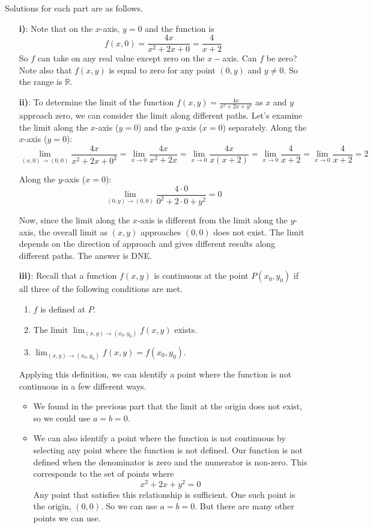     {\color{DarkBlue} 
    Solutions for each part are as follows. 
    \begin{itemize}
        \item[\textbf{i)}:] Note that on the $x$-axis, $y=0$ and the function is
        $$f(x,0) = \frac{4x}{x^2+2x+0} = \frac{4}{x+2}$$
        So $f$ can take on any real value except zero on the $x-$axis. Can $f$ be zero? Note also that $f(x,y)$ is equal to zero for any point $(0,y)$ and $y \ne 0$.  So the range is $\mathbb R$.

        \item[\textbf{ii)}:]  To determine the limit of the function \(f(x, y) = \frac{4x}{x^2 + 2x + y^2}\) as \(x\) and \(y\) approach zero, we can consider the limit along different paths. Let's examine the limit along the \(x\)-axis (\(y = 0\)) and the \(y\)-axis (\(x = 0\)) separately.
        Along the \(x\)-axis (\(y = 0\)):
           \[ \lim_{(x,0)\to(0,0)} \frac{4x}{x^2 + 2x + 0^2} = \lim_{x\to0} \frac{4x}{x^2 + 2x} = \lim_{x\to0} \frac{4x}{x(x + 2)} = \lim_{x\to0} \frac{4}{x + 2} = \lim_{x\to0} \frac{4}{x + 2} = 2 \]
        
            Along the \(y\)-axis (\(x = 0\)):
           \[ \lim_{(0,y)\to(0,0)} \frac{4 \cdot 0}{0^2 + 2 \cdot 0 + y^2} = 0 \]
        
        Now, since the limit along the \(x\)-axis is different from the limit along the \(y\)-axis, the overall limit as \((x, y)\) approaches \((0, 0)\) does not exist. The limit depends on the direction of approach and gives different results along different paths. The answer is DNE. 

        \item[\textbf{iii)}:] Recall that a function $f(x, y)$ is continuous at the point $P(x_0 , y_0 )$ if all three of the following conditions are met. 
        \begin{enumerate}
            \item $f$ is defined at $P$. 
            \item The limit $\displaystyle \lim_{(x,y) \to (x_0,y_0)}f(x,y)$ exists. 
            \item $\displaystyle \lim_{(x,y) \to (x_0,y_0)}f(x,y) = f(x_0,y_0)$.  
        \end{enumerate}
    
        Applying this definition, we can identify a point where the function is not continuous in a few different ways. 
        \begin{itemize}
            \item We found in the previous part that the limit at the origin does not exist, so we could use $a = b = 0$. 
            \item We can also identify a point where the function is not continuous by selecting any point where the function is not defined. Our function is not defined when the denominator is zero and the numerator is non-zero. This corresponds to the set of points where     
        $$x^2+2x+y^2 = 0$$
        Any point that satisfies this relationship is sufficient. One such point is the origin, $(0,0)$. So we can use $a = b = 0$. But there are many other points we can use. 
        \end{itemize}
        

\end{itemize}}
